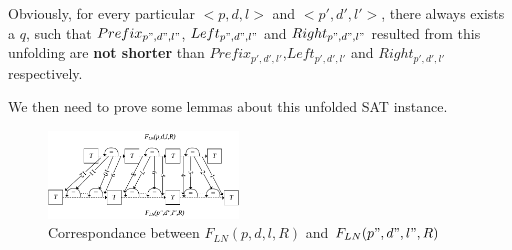 \documentclass[journal]{IEEEtran}
\begin{document}
Obviously,
for every particular $<p,d,l>$ and $<p',d',l'>$,
there always exists a $q$,
such that $Prefix_{p",d",l"}$, $Left_{p",d",l"}$ and $Right_{p",d",l"}$ resulted from this unfolding
are \textbf{not shorter} than $Prefix_{p',d',l'}$,$Left_{p',d',l'}$ and $Right_{p',d',l'}$ respectively.




We then need to prove some lemmas about this unfolded SAT instance.
\begin{figure}[b]
\centering
\includegraphics[width=0.45\textwidth]{doubleloop_unfold_cmp}
\caption{Correspondance between $F_{LN}(p,d,l,R)$ and $F_{LN}(p",d",l",R)$}
\label{doubleloop_unfold_cmp}
\end{figure}
\end{document}
